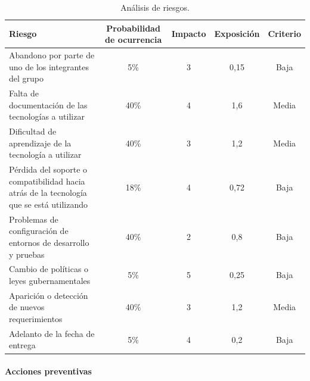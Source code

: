 \begin{enumerate}
    \begin{table}[h]
        \centering
        \begin{tabulary}{\textwidth}{|L|C|c|c|c|}
            \hline
            {\bf Riesgo}      & {\bf Probabilidad de ocurrencia} & {\bf Impacto} & {\bf Exposición} & {\bf Criterio}    \\ \hline
             Abandono por parte de uno de los integrantes del grupo                                   & 5\%  & 3 & 0,15 & Baja \\ \hline
             Falta de documentación de las tecnologías a utilizar                                     & 40\% & 4 & 1,6 & Media \\ \hline
             Dificultad de aprendizaje de la tecnología a utilizar                                    & 40\% & 3 & 1,2 & Media \\ \hline
             Pérdida del soporte o compatibilidad hacia atrás de la tecnología que se está utilizando & 18\% & 4 & 0,72 & Baja \\ \hline
             Problemas de configuración de entornos de desarrollo y pruebas                           & 40\% & 2 & 0,8 & Baja \\ \hline
             Cambio de políticas o leyes gubernamentales                                              & 5\%  & 5 & 0,25 & Baja \\ \hline
             Aparición o detección de nuevos requerimientos                                           & 40\% & 3 & 1,2 & Media \\ \hline
             Adelanto de la fecha de entrega                                                          & 5\%  & 4 & 0,2 & Baja \\ \hline
        \end{tabulary}
        \caption{Análisis de riesgos.}
        \label{Final-analisis-riesgo}
    \end{table}
    
\end{enumerate}



\paragraph{Acciones preventivas}

